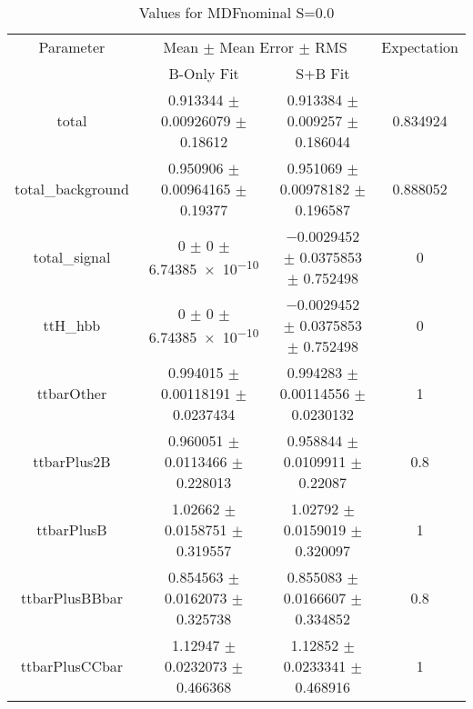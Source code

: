 \begin{table}
\centering
\caption{Values for MDFnominal S=0.0}
\begin{tabular}{cccc}
\toprule
Parameter & \multicolumn{2}{c}{Mean $\pm$ Mean Error $\pm$ RMS} & Expectation\\
 & B-Only Fit & S+B Fit & \\
\midrule
total & \num{0.913344} $\pm$ \num{0.00926079} $\pm$ \num{0.18612} & \num{0.913384} $\pm$ \num{0.009257} $\pm$ \num{0.186044} & \num{0.834924}\\
total\_background & \num{0.950906} $\pm$ \num{0.00964165} $\pm$ \num{0.19377} & \num{0.951069} $\pm$ \num{0.00978182} $\pm$ \num{0.196587} & \num{0.888052}\\
total\_signal & \num{0} $\pm$ \num{0} $\pm$ \num{6.74385e-10} & \num{-0.0029452} $\pm$ \num{0.0375853} $\pm$ \num{0.752498} & \num{0}\\
ttH\_hbb & \num{0} $\pm$ \num{0} $\pm$ \num{6.74385e-10} & \num{-0.0029452} $\pm$ \num{0.0375853} $\pm$ \num{0.752498} & \num{0}\\
ttbarOther & \num{0.994015} $\pm$ \num{0.00118191} $\pm$ \num{0.0237434} & \num{0.994283} $\pm$ \num{0.00114556} $\pm$ \num{0.0230132} & \num{1}\\
ttbarPlus2B & \num{0.960051} $\pm$ \num{0.0113466} $\pm$ \num{0.228013} & \num{0.958844} $\pm$ \num{0.0109911} $\pm$ \num{0.22087} & \num{0.8}\\
ttbarPlusB & \num{1.02662} $\pm$ \num{0.0158751} $\pm$ \num{0.319557} & \num{1.02792} $\pm$ \num{0.0159019} $\pm$ \num{0.320097} & \num{1}\\
ttbarPlusBBbar & \num{0.854563} $\pm$ \num{0.0162073} $\pm$ \num{0.325738} & \num{0.855083} $\pm$ \num{0.0166607} $\pm$ \num{0.334852} & \num{0.8}\\
ttbarPlusCCbar & \num{1.12947} $\pm$ \num{0.0232073} $\pm$ \num{0.466368} & \num{1.12852} $\pm$ \num{0.0233341} $\pm$ \num{0.468916} & \num{1}\\
\bottomrule
\end{tabular}
\end{table}